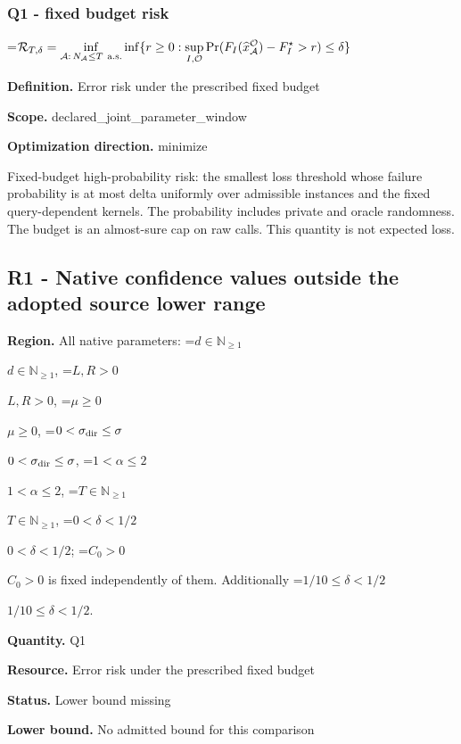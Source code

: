 \documentclass[10pt,a4paper]{article}
\newcommand{\AtlasMath}[1]{\par\begingroup\centering\setbox0=\hbox{$\displaystyle #1$}\ifdim\wd0>1.4\linewidth\typeout{ATLAS WIDE FORMULA: \the\wd0}\fi\ifdim\wd0>\linewidth\resizebox{\linewidth}{!}{\box0}\else\box0\fi\par\endgroup}
\newcommand{\AtlasInlineMath}[1]{\begingroup\setbox0=\hbox{$#1$}\ifdim\wd0>.4\linewidth\endgroup\AtlasMath{#1}\else\endgroup$#1$\fi}
\begin{document}
\subsubsection{Q1 - fixed budget risk}


\AtlasMath{\mathcal R_{T,\delta}=\inf_{\mathcal A:\,N_{\mathcal A}\le T\ {\rm a.s.}}\inf\{r\ge0:\sup_{I,\mathcal O}\Pr(F_I(\widehat x_{\mathcal A}^{\mathcal O})-F_I^\star>r)\le\delta\}}


\textbf{Definition.} Error risk under the prescribed fixed budget



\textbf{Scope.} declared\_joint\_parameter\_window



\textbf{Optimization direction.} minimize



Fixed-budget high-probability risk: the smallest loss threshold whose failure probability is at most delta uniformly over admissible instances and the fixed query-dependent kernels. The probability includes private and oracle randomness. The budget is an almost-sure cap on raw calls. This quantity is not expected loss.



\subsection{R1 - Native confidence values outside the adopted source lower range}


\textbf{Region.} All native parameters: \AtlasInlineMath{d\in\mathbb N_{\ge1}}, \AtlasInlineMath{L,R>0}, \AtlasInlineMath{\mu\ge0}, \AtlasInlineMath{0<\sigma_{\rm dir}\le\sigma}, \AtlasInlineMath{1<\alpha\le2}, \AtlasInlineMath{T\in\mathbb N_{\ge1}}, \AtlasInlineMath{0<\delta<1/2}; \AtlasInlineMath{C_0>0} is fixed independently of them. Additionally \AtlasInlineMath{1/10\le\delta<1/2}.



\textbf{Quantity.} Q1



\textbf{Resource.} Error risk under the prescribed fixed budget



\textbf{Status.} Lower bound missing



\textbf{Lower bound.} No admitted bound for this comparison
\end{document}
